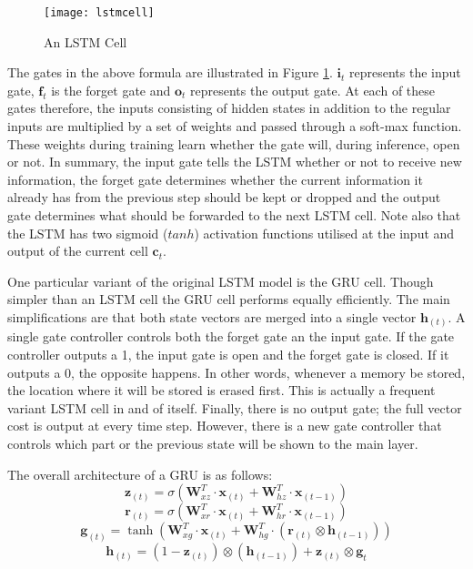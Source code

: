 \begin{figure}
\centering
  \texttt{[image: lstmcell]}\\
  \caption{An LSTM Cell \cite{graves2013hybrid}}\label{fig_3_3_lstmcell}
\end{figure}

The gates in the above formula are illustrated in Figure \ref{fig_3_3_lstmcell}.  $\mathbf{i}_t$ represents the input gate, $\mathbf{f}_t$ is the forget gate and $\mathbf{o}_t$ represents the output gate.  At each of these gates therefore, the inputs consisting of hidden states in addition to the regular inputs are multiplied by a set of weights and passed through a soft-max function. These weights during training learn whether the gate will, during inference, open or not.  In summary, the input gate tells the LSTM whether or not to receive new information, the forget gate determines whether the current information it already has from the previous step should be kept or dropped and the output gate determines what should be forwarded to the next LSTM cell.  Note also that the LSTM has two sigmoid ($tanh$) activation functions utilised at the input and output of the current cell $\mathbf{c}_t$.

One particular variant of the original LSTM model is the GRU cell. Though simpler than an LSTM cell the GRU cell performs equally efficiently.  The main simplifications are that both state vectors are merged into a single vector $\mathbf{h}_{(t)}$. A single gate controller controls both the forget gate an the input gate.   If the gate controller outputs a 1, the input gate is open and the forget gate is closed.  If it outputs a 0, the opposite happens.  In other words, whenever a memory be stored, the location where it will be stored is erased first.  This is actually a frequent variant LSTM cell in and of itself. Finally, there is no output gate; the full vector cost is output at every time step.  However, there is a new gate controller that controls which part or the previous state will be shown to the main layer.

The overall architecture of a GRU is as follows:
\begin{equation}
\mathbf{z}_{(t)}=\sigma(\mathbf{W}_{xz}^T\cdot\mathbf{x}_{(t)}+\mathbf{W}_{hz}^T\cdot\mathbf{x}_{(t-1)})\label{eqn_c3_gru01}
\end{equation}
\begin{equation}
\mathbf{r}_{(t)}=\sigma(\mathbf{W}_{xr}^T\cdot\mathbf{x}_{(t)}+\mathbf{W}_{hr}^T\cdot\mathbf{x}_{(t-1)})\label{eqn_c3_gru01}
\end{equation}\begin{equation}
\mathbf{g}_{(t)}=\tanh(\mathbf{W}_{xg}^T\cdot\mathbf{x}_{(t)}+\mathbf{W}_{hg}^T\cdot(\mathbf{r}_{(t)}\otimes\mathbf{h}_{(t-1)}))\label{eqn_c3_gru01}
\end{equation}\begin{equation}
\mathbf{h}_{(t)}=(1-\mathbf{z}_{(t)})\otimes(\mathbf{h}_{(t-1)})+\mathbf{z}_{(t)}\otimes\mathbf{g}_{t}\label{eqn_c3_gru01}
\end{equation}

